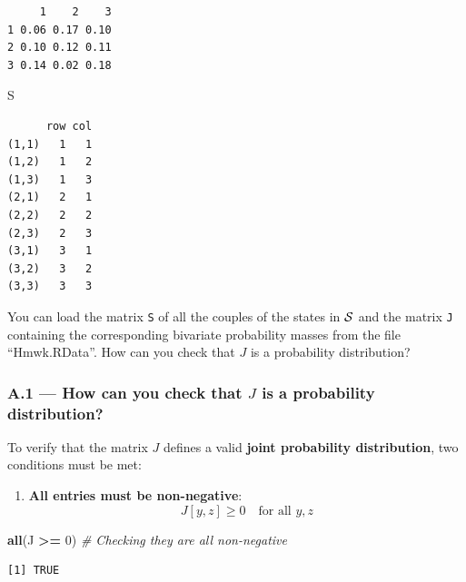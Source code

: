\documentclass[
]{article}
\newenvironment{Shaded}{\begin{snugshade}}{\end{snugshade}}
\newcommand{\CommentTok}[1]{\textcolor[rgb]{0.56,0.35,0.01}{\textit{#1}}}
\newcommand{\DecValTok}[1]{\textcolor[rgb]{0.00,0.00,0.81}{#1}}
\newcommand{\FunctionTok}[1]{\textcolor[rgb]{0.13,0.29,0.53}{\textbf{#1}}}
\newcommand{\NormalTok}[1]{#1}
\newcommand{\SpecialCharTok}[1]{\textcolor[rgb]{0.81,0.36,0.00}{\textbf{#1}}}
\providecommand{\tightlist}{%
  \setlength{\itemsep}{0pt}\setlength{\parskip}{0pt}}
\begin{document}
\begin{verbatim}
     1    2    3
1 0.06 0.17 0.10
2 0.10 0.12 0.11
3 0.14 0.02 0.18
\end{verbatim}

\begin{Shaded}
\begin{Highlighting}[]
\NormalTok{S}
\end{Highlighting}
\end{Shaded}

\begin{verbatim}
      row col
(1,1)   1   1
(1,2)   1   2
(1,3)   1   3
(2,1)   2   1
(2,2)   2   2
(2,3)   2   3
(3,1)   3   1
(3,2)   3   2
(3,3)   3   3
\end{verbatim}

You can load the matrix \texttt{S} of all the couples of the states in
\({\cal S}\) and the matrix \texttt{J} containing the corresponding
bivariate probability masses from the file ``Hmwk.RData''. How can you
check that \(J\) is a probability distribution?

\subsubsection{\texorpdfstring{A.1 --- How can you check that \(J\) is a
probability
distribution?}{A.1 --- How can you check that J is a probability distribution?}}\label{a.1-how-can-you-check-that-j-is-a-probability-distribution}

To verify that the matrix \(J\) defines a valid \textbf{joint
probability distribution}, two conditions must be met:

\begin{enumerate}
\def\labelenumi{\arabic{enumi}.}
\tightlist
\item
  \textbf{All entries must be non-negative}: \[
  J[y, z] \geq 0 \quad \text{for all } y, z
  \]
\end{enumerate}

\begin{Shaded}
\begin{Highlighting}[]
\FunctionTok{all}\NormalTok{(J }\SpecialCharTok{\textgreater{}=} \DecValTok{0}\NormalTok{) }\CommentTok{\# Checking they are all non{-}negative}
\end{Highlighting}
\end{Shaded}

\begin{verbatim}
[1] TRUE
\end{verbatim}
\end{document}
